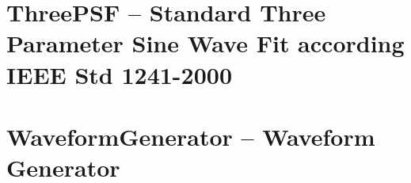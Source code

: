 \documentclass[12pt,a4paper,oneside]{report} %
\begin{document}
\section*{\infosection} %

\section*{\examplesection} %

\resumecontents[maintoc]

\chapter{ThreePSF -- Standard Three Parameter Sine Wave Fit according IEEE Std 1241-2000} %
\stopcontents[maintoc]
\section*{\infosection} %

\section*{\examplesection} %

\resumecontents[maintoc]

\chapter{WaveformGenerator -- Waveform Generator} %
\stopcontents[maintoc]
\section*{\infosection} %

\section*{\examplesection} %

\resumecontents[maintoc]
\end{document}
